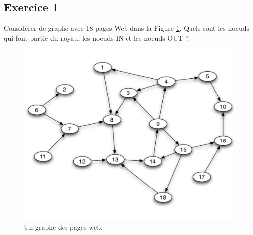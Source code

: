 \section{}









\subsection*{Exercice 1}
Considèrer de graphe avec 18 pages Web dans la Figure \ref{fig:webg}. Quels sont les noeuds qui font partie du noyau, les noeuds IN et les noeuds
OUT ? 

    \begin{figure}[h!]
    \begin{center}
    \includegraphics[scale = 0.3]{figs/graph.png}
    \end{center}
    \caption{Un graphe des pages web.}
    \label{fig:webg}
    \end{figure}

